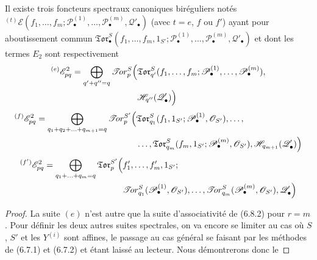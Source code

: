\begin{proposition}[6.9.3]
Il existe trois foncteurs spectraux canoniques biréguliers notés
${}^{(t)}\mathscr E(f_1,\ldots,f_m;
\mathscr P_\bullet^{(1)},\ldots,\mathscr P_\bullet^{(m)},
\mathscr Q'_\bullet)$ (avec $t=e$, $f$ ou $f'$) ayant pour aboutissement
commun
$\mathfrak{Tor}_\bullet^S(f_1,\ldots,f_m,1_{S'};
\mathscr P_\bullet^{(1)},\ldots,\mathscr P_\bullet^{(m)},
\mathscr Q'_\bullet)$ et dont les termes $E_2$ sont respectivement
\[
\begin{split}
  {}^{(e)}\mathscr E_{pq}^2
  =\bigoplus_{q'+q''=q}
  \mathscr{T}\!or_p^S\Bigl(
  &\mathfrak{Tor}_{q'}^S
  (f_1,\ldots,f_m;
   \mathscr P_\bullet^{(1)},\ldots,\mathscr P_\bullet^{(m)}),\\
  &\mathscr H_{q''}(\mathscr Q'_\bullet)
  \Bigr)
\end{split}
\]
\[
\begin{split}
  {}^{(f)}\mathscr E_{pq}^2
  =\bigoplus_{q_1+q_2+\ldots+q_{m+1}=q}
  \mathscr{T}\!or_p^{S'}\Bigl(
  &\mathfrak{Tor}_{q_1}^S
  (f_1,1_{S'};\mathscr P_\bullet^{(1)},\mathscr O_{S'}),\ldots,\\
  &\ldots,\mathfrak{Tor}_{q_m}^S
  (f_m,1_{S'};\mathscr P_\bullet^{(m)},\mathscr O_{S'}),
  \mathscr H_{q_{m+1}}(\mathscr Q'_\bullet)
  \Bigr)
\end{split}
\]
\[
\begin{split}
  {}^{(f')}\mathscr E_{pq}^2
  =\bigoplus_{q_1+\ldots+q_m=q}
  \mathfrak{Tor}_p^{S'}\Bigl(
  &f'_1,\ldots,f'_m,1_{S'};\\
  &\mathscr{T}\!or_{q_1}^S
  (\mathscr P_\bullet^{(1)},\mathscr O_{S'}),\ldots,
  \mathscr{T}\!or_{q_m}^S
  (\mathscr P_\bullet^{(m)},\mathscr O_{S'}),
  \mathscr Q'_\bullet
  \Bigr)
\end{split}
\]
\end{proposition}

\begin{proof}
La suite $(e)$ n'est autre que la suite d'associativité de (6.8.2) pour
$r=m$. Pour définir les deux autres suites spectrales, on va encore se limiter
au cas où $S$, $S'$ et les $Y^{(i)}$ sont affines, le passage au cas général
se faisant par les méthodes de (6.7.1) et (6.7.2) et étant laissé au lecteur.
Nous démontrerons donc le
\end{proof}


